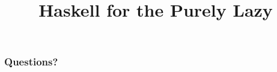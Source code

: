 \documentclass{beamer}
\title{Haskell for the Purely Lazy}
\begin{document}
\frame{\titlepage}





\begin{frame}
    \frametitle{Questions?}
\end{frame}
\end{document}
